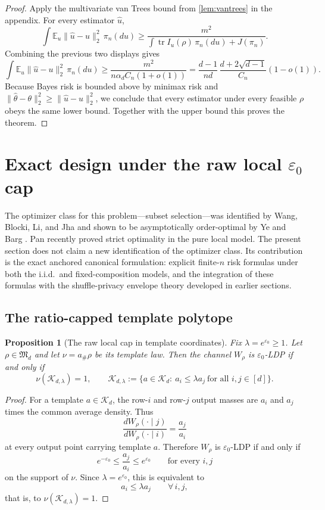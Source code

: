\documentclass[11pt]{amsart}
\newtheorem{proposition}[proposition]{Proposition}
\theoremstyle{definition}
\DeclareMathOperator{\tr}{tr}
\newcommand{\E}{\mathbb E}
\newcommand{\fM}{\mathfrak M}
\newcommand{\cK}{\mathcal K}
\begin{document}
\begin{proof}
Apply the multivariate van Trees bound from \cref{lem:vantrees} in the appendix. For every estimator $\widehat u$,
\[
\int \E_u\|\widehat u-u\|_2^2\,\pi_n(du)
\ge
\frac{m^2}{\int \tr I_u(\rho)\,\pi_n(du)+J(\pi_n)}.
\]
Combining the previous two displays gives
\[
\int \E_u\|\widehat u-u\|_2^2\,\pi_n(du)
\ge
\frac{m^2}{n\alpha_d C_n(1+o(1))}
=\frac{d-1}{nd}\,\frac{d+2\sqrt{d-1}}{C_n}(1-o(1)).
\]
Because Bayes risk is bounded above by minimax risk and $\|\widehat\theta-\theta\|_2^2\ge\|\widehat u-u\|_2^2$, we conclude that every estimator under every feasible $\rho$ obeys the same lower bound. Together with the upper bound this proves the theorem.
\end{proof}

\section{Exact design under the raw local \texorpdfstring{$\varepsilon_0$}{epsilon0} cap}\label{sec:raw}

The optimizer class for this problem---subset selection---was identified by Wang, Blocki, Li, and Jha \cite{wang-ldp} and shown to be asymptotically order-optimal by Ye and Barg \cite{ye-barg}. Pan \cite{pan-strict} recently proved strict optimality in the pure local model. The present section does not claim a new identification of the optimizer class. Its contribution is the exact anchored canonical formulation: explicit finite-$n$ risk formulas under both the i.i.d.\ and fixed-composition models, and the integration of these formulas with the shuffle-privacy envelope theory developed in earlier sections.

\subsection{The ratio-capped template polytope}

\begin{proposition}[The raw local cap in template coordinates]\label{prop:raw-cap}
Fix $\lambda=e^{\varepsilon_0}\ge 1$. Let $\rho\in\fM_d$ and let $\nu=a_\#\rho$ be its template law. Then the channel $W_\rho$ is $\varepsilon_0$-LDP if and only if
\[
\nu(\cK_{d,\lambda})=1,
\qquad
\cK_{d,\lambda}:=\{a\in\cK_d:\ a_i\le \lambda a_j\ \text{for all }i,j\in[d]\}.
\]
\end{proposition}

\begin{proof}
For a template $a\in\cK_d$, the row-$i$ and row-$j$ output masses are $a_i$ and $a_j$ times the common average density. Thus
\[
\frac{dW_\rho(\cdot\mid j)}{dW_\rho(\cdot\mid i)}= \frac{a_j}{a_i}
\]
at every output point carrying template $a$. Therefore $W_\rho$ is $\varepsilon_0$-LDP if and only if
\[
e^{-\varepsilon_0}\le \frac{a_j}{a_i}\le e^{\varepsilon_0}
\qquad\text{for every }i,j
\]
on the support of $\nu$. Since $\lambda=e^{\varepsilon_0}$, this is equivalent to
\[
a_i\le \lambda a_j \qquad\forall\, i,j,
\]
that is, to $\nu(\cK_{d,\lambda})=1$.
\end{proof}
\end{document}
